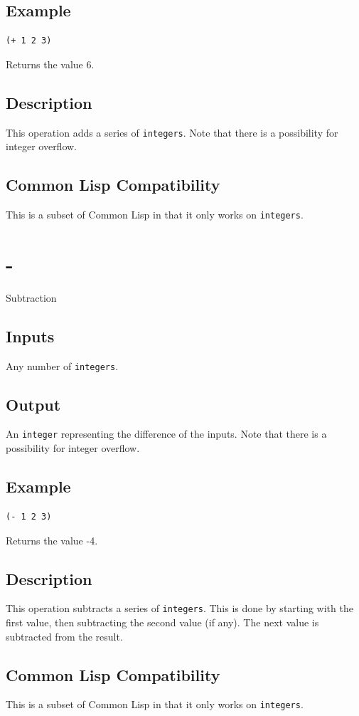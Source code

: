 \documentclass[10pt, openany]{book}
\newcommand{\datatype}[1]{\texttt{#1}}
\newcommand{\cl}{Common Lisp}
\begin{document}
\subsection{Example}
\begin{lstlisting}
(+ 1 2 3)
\end{lstlisting}
Returns the value 6.
\subsection{Description}
This operation adds a series of \datatype{integers}.  Note that there is a possibility for integer overflow.
\subsection{Common Lisp Compatibility}
This is a subset of \cl{} in that it only works on \datatype{integers}.

\section{-}
Subtraction
\subsection{Inputs}
Any number of \datatype{integers}.
\subsection{Output}
An \datatype{integer} representing the difference of the inputs.  Note that there is a possibility for integer overflow.
\subsection{Example}
\begin{lstlisting}
(- 1 2 3)
\end{lstlisting}
Returns the value -4.
\subsection{Description}
This operation subtracts a series of \datatype{integers}.  This is done by starting with the first value, then subtracting the second value (if any).  The next value is subtracted from the result.
\subsection{Common Lisp Compatibility}
This is a subset of \cl{} in that it only works on \datatype{integers}.
\end{document}
